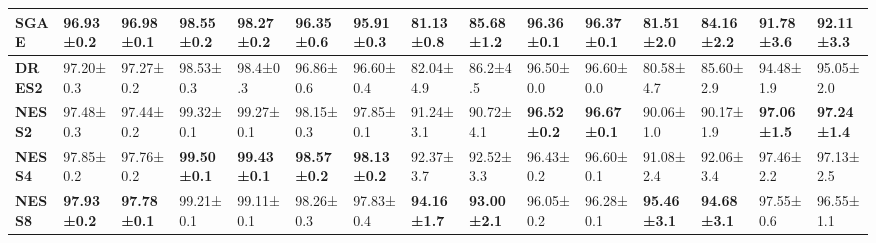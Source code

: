 \documentclass{article}
\begin{document}
\begin{table*}[tb]
\begin{center}
\begin{small}
\begin{sc}
{{\begin{tabular}{lllllllllllllll}
\textbf{SGAE}& 96.93±0.2                      & 96.98±0.1                      & 98.55±0.2                      & 98.27±0.2                        & 96.35±0.6                      & 95.91±0.3                       & 81.13±0.8                       & 85.68±1.2                       & 96.36±0.1                     & 96.37±0.1                       & 81.51±2.0                      & 84.16±2.2                        & 91.78±3.6                       & 92.11±3.3                       \\
\midrule
\textbf{DRES2}& 97.20±0.3     & 97.27±0.2                       & 98.53±0.3                      & 98.4±0.3                       & 96.86±0.6                      & 96.60±0.4                       & 82.04±4.9                      & 86.2±4.5                       & 96.50±0.0                      & 96.60±0.0                      & 80.58±4.7                      & 85.60±2.9                       & 94.48±1.9                     & 95.05±2.0    \\                   
\textbf{NESS2}& 97.48±0.3                      & 97.44±0.2                       & 99.32±0.1                      & 99.27±0.1                        & 98.15±0.3                       & 97.85±0.1                       & 91.24±3.1                      & 90.72±4.1                        & \textbf{96.52±0.2}             & \textbf{96.67±0.1}              & 90.06±1.0                       & 90.17±1.9                       & \textbf{97.06±1.5}             & \textbf{97.24±1.4}  \\            
\textbf{NESS4}& 97.85±0.2                      & 97.76±0.2                       & \textbf{99.50±0.1}              & \textbf{99.43±0.1}              & \textbf{98.57±0.2}              & \textbf{98.13±0.2}              & 92.37±3.7                     & 92.52±3.3                       & 96.43±0.2                      & 96.60±0.1                       & 91.08±2.4                      & 92.06±3.4                       & 97.46±2.2                      & 97.13±2.5                      \\
\textbf{NESS8}& \textbf{97.93±0.2}             & \textbf{97.78±0.1}              & 99.21±0.1                      & 99.11±0.1                       & 98.26±0.3                      & 97.83±0.4                       & \textbf{94.16±1.7}             & \textbf{93.00±2.1}               & 96.05±0.2                      & 96.28±0.1                       & \textbf{95.46±3.1}             & \textbf{94.68±3.1}              & 97.55±0.6                      & 96.55±1.1     \\
\bottomrule

\end{tabular}}{}
}
\end{sc}
\end{small}
\end{center}
\vskip -0.1in
\end{table*}
\end{document}
